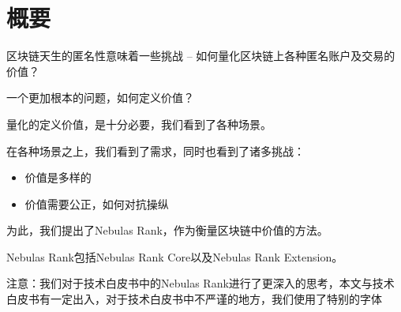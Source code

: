 \section{概要}


区块链天生的匿名性意味着一些挑战 -- 如何量化区块链上各种匿名账户及交易的价值？

一个更加根本的问题，如何定义价值？

量化的定义价值，是十分必要，我们看到了各种场景。

在各种场景之上，我们看到了需求，同时也看到了诸多挑战：
\begin{itemize}
\item 价值是多样的
\item 价值需要公正，如何对抗操纵
\end{itemize}

为此，我们提出了Nebulas Rank，作为衡量区块链中价值的方法。

Nebulas Rank包括Nebulas Rank Core以及Nebulas Rank Extension。

注意：我们对于技术白皮书中的Nebulas Rank进行了更深入的思考，本文与技术白皮书有一定出入，对于技术白皮书中不严谨的地方，我们使用了特别的字体
